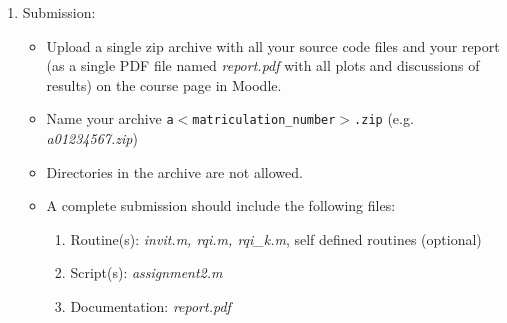 \documentclass{scrartcl}
\begin{document}
\begin{enumerate}
	\item Submission:
	\begin{itemize}		
		\item  Upload a single zip archive with all your source code files and your report (as a single
			PDF file named \textit{report.pdf} with all plots and discussions of results) on the course page in Moodle.
		\item Name your archive \texttt{a$<$matriculation\_number$>$.zip} (e.g. \textit{a01234567.zip})
		\item Directories in the archive are not allowed.
		\item A complete submission should include the following files:
		\begin{enumerate}
		\item Routine(s): \textit{invit.m, rqi.m, rqi\_k.m}, self defined routines (optional)
		\item Script(s): \textit{assignment2.m}
		\item Documentation: \textit{report.pdf}
		\end{enumerate}
		
		\end{itemize}
	\end{enumerate}
\end{document}
